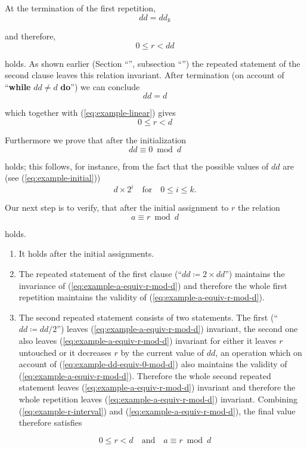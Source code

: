 \documentclass[twoside,11pt]{book}
\begin{document}
At the termination of the first repetition,
$$
dd=dd_k
$$

\noindent
and therefore,
\begin{equation}
	\label{eq:example-linear}
	0 \leqslant r <dd
\end{equation}

\noindent
holds. As shown earlier (Section ``'', subsection ``'') the repeated statement of the second clause leaves this relation invariant. After termination (on account of ``\textbf{while} $dd \neq d$ \textbf{do}'') we can
conclude
$$
dd = d
$$

\noindent
which together with (\ref{eq:example-linear}) gives
\begin{equation}
	\label{eq:example-r-interval}
	0 \leqslant r < d
\end{equation}

Furthermore we prove that after the initialization
\begin{equation}
	\label{eq:example-dd-equiv-0-mod-d}
	dd \equiv 0 \bmod d
\end{equation}

\noindent
holds; this follows, for instance, from the fact that the possible values of $dd$ are (see (\ref{eq:example-initial}))
$$
d\times 2^i\quad \text{for}\quad 0 \leqslant i \leqslant k.
$$

Our next step is to verify, that after the initial assignment to $r$ the relation
\begin{equation}
	\label{eq:example-a-equiv-r-mod-d}
	a \equiv r \bmod d
\end{equation}

\noindent
holds.

\begin{enumerate}[wide, nosep, label=(\arabic*)]
	\item It holds after the initial assignments.
	\item The repeated statement of the first clause (``$dd \coloneq 2\times dd$'') maintains the invariance of (\ref{eq:example-a-equiv-r-mod-d}) and therefore the whole first repetition maintains the validity of (\ref{eq:example-a-equiv-r-mod-d}). 
	\item The second repeated statement consists of two statements. The first (``$dd \coloneq dd/2$'') leaves (\ref{eq:example-a-equiv-r-mod-d}) invariant, the second one also leaves (\ref{eq:example-a-equiv-r-mod-d}) invariant for either it leaves $r$ untouched or it decreases $r$ by the current value of $dd$, an operation which on account of (\ref{eq:example-dd-equiv-0-mod-d}) also maintains the validity of (\ref{eq:example-a-equiv-r-mod-d}). Therefore the whole second repeated statement leaves (\ref{eq:example-a-equiv-r-mod-d}) invariant and therefore the whole repetition leaves (\ref{eq:example-a-equiv-r-mod-d}) invariant. Combining (\ref{eq:example-r-interval}) and (\ref{eq:example-a-equiv-r-mod-d}), the final value	therefore satisfies
\end{enumerate}
\medskip
$$
0 \leqslant r < d\quad \text{and}\quad a \equiv r \bmod d
$$
\end{document}
